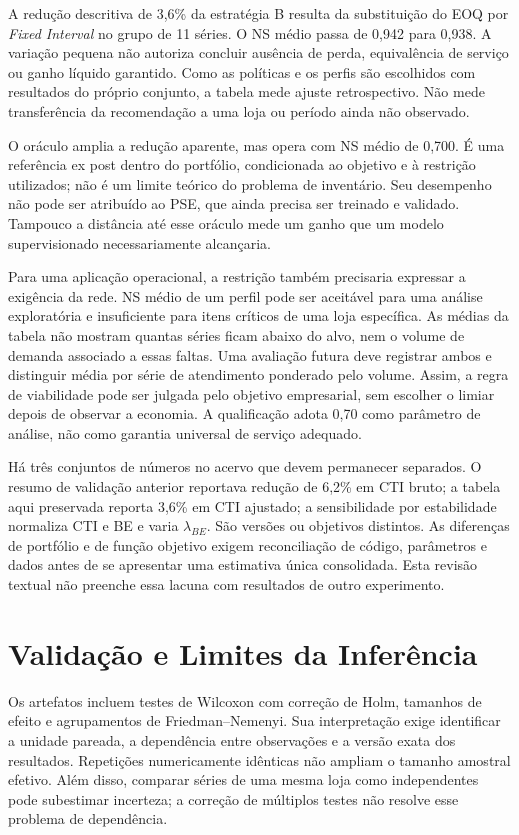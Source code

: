 A redução descritiva de 3,6\% da estratégia B resulta da substituição do EOQ por \textit{Fixed Interval} no grupo de 11 séries. O NS médio passa de 0,942 para 0,938. A variação pequena não autoriza concluir ausência de perda, equivalência de serviço ou ganho líquido garantido. Como as políticas e os perfis são escolhidos com resultados do próprio conjunto, a tabela mede ajuste retrospectivo. Não mede transferência da recomendação a uma loja ou período ainda não observado.

O oráculo amplia a redução aparente, mas opera com NS médio de 0,700. É uma referência ex post dentro do portfólio, condicionada ao objetivo e à restrição utilizados; não é um limite teórico do problema de inventário. Seu desempenho não pode ser atribuído ao PSE, que ainda precisa ser treinado e validado. Tampouco a distância até esse oráculo mede um ganho que um modelo supervisionado necessariamente alcançaria.

Para uma aplicação operacional, a restrição também precisaria expressar a exigência da rede. NS médio de um perfil pode ser aceitável para uma análise exploratória e insuficiente para itens críticos de uma loja específica. As médias da tabela não mostram quantas séries ficam abaixo do alvo, nem o volume de demanda associado a essas faltas. Uma avaliação futura deve registrar ambos e distinguir média por série de atendimento ponderado pelo volume. Assim, a regra de viabilidade pode ser julgada pelo objetivo empresarial, sem escolher o limiar depois de observar a economia. A qualificação adota 0,70 como parâmetro de análise, não como garantia universal de serviço adequado.

Há três conjuntos de números no acervo que devem permanecer separados. O resumo de validação anterior reportava redução de 6,2\% em CTI bruto; a tabela aqui preservada reporta 3,6\% em CTI ajustado; a sensibilidade por estabilidade normaliza CTI e BE e varia $\lambda_{BE}$. São versões ou objetivos distintos. As diferenças de portfólio e de função objetivo exigem reconciliação de código, parâmetros e dados antes de se apresentar uma estimativa única consolidada. Esta revisão textual não preenche essa lacuna com resultados de outro experimento.

\section{Validação e Limites da Inferência}
\label{sec:stats}

Os artefatos incluem testes de Wilcoxon com correção de Holm, tamanhos de efeito e agrupamentos de Friedman--Nemenyi. Sua interpretação exige identificar a unidade pareada, a dependência entre observações e a versão exata dos resultados. Repetições numericamente idênticas não ampliam o tamanho amostral efetivo. Além disso, comparar séries de uma mesma loja como independentes pode subestimar incerteza; a correção de múltiplos testes não resolve esse problema de dependência.

